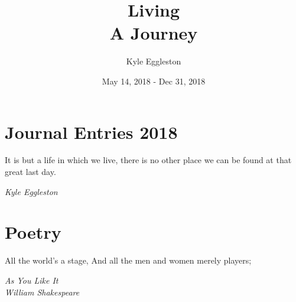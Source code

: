 \documentclass{book}
\title{%
  Living \\
  \large A Journey}
\author{Kyle Eggleston}
\date{May 14, 2018 - Dec 31, 2018}
\begin{document}
\maketitle
\thispagestyle{empty}

\frontmatter

\tableofcontents

\listoftables

\listoffigures

\newpage



\mainmatter

\chapter{Journal Entries 2018}
\epigraph{It is but a life in which we live, there is no other place we can be
found at that great last day.}{\textit{Kyle Eggleston}}


\chapter{Poetry}
\epigraph{All the world's a stage, And all the men and women merely players;}
{\textit{As You Like It \\ William Shakespeare}}


\backmatter
\printbibliography
\end{document}
